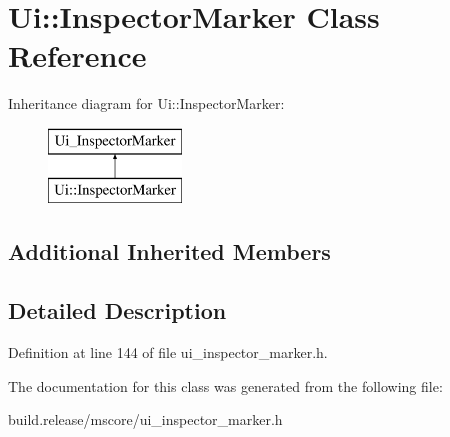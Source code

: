 \hypertarget{class_ui_1_1_inspector_marker}{}\section{Ui\+:\+:Inspector\+Marker Class Reference}
\label{class_ui_1_1_inspector_marker}
Inheritance diagram for Ui\+:\+:Inspector\+Marker\+:\begin{figure}[H]
\begin{center}
\leavevmode
\includegraphics[height=2.000000cm]{class_ui_1_1_inspector_marker}
\end{center}
\end{figure}
\subsection*{Additional Inherited Members}


\subsection{Detailed Description}


Definition at line 144 of file ui\+\_\+inspector\+\_\+marker.\+h.



The documentation for this class was generated from the following file\+:\begin{DoxyCompactItemize}
\item 
build.\+release/mscore/ui\+\_\+inspector\+\_\+marker.\+h\end{DoxyCompactItemize}
